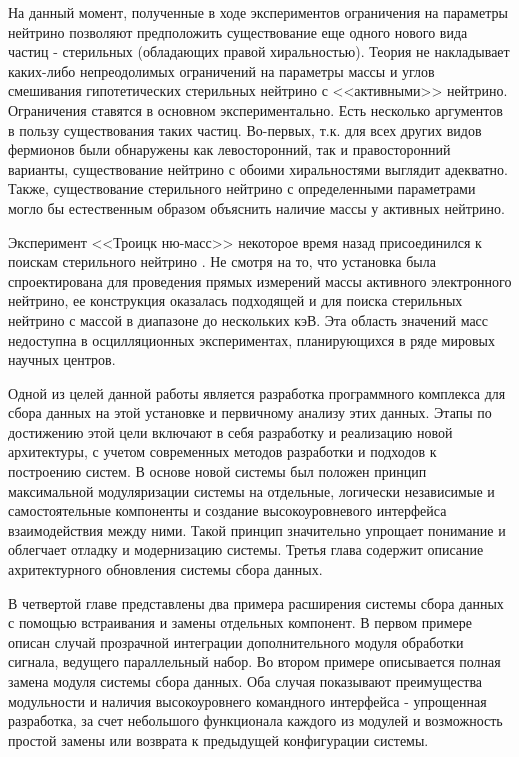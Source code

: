\documentclass[a4paper,14pt]{extreport}
\begin{document}
На данный момент, полученные в ходе экспериментов ограничения на параметры нейтрино позволяют предположить существование еще одного нового вида частиц - стерильных (обладающих правой хиральностью). Теория не накладывает каких-либо непреодолимых ограничений на параметры массы и углов смешивания гипотетических стерильных нейтрино с <<активными>> нейтрино. Ограничения ставятся в основном экспериментально. Есть несколько аргументов в пользу существования таких частиц. Во-первых, т.к. для всех других видов фермионов были обнаружены как левосторонний, так и правосторонний варианты, существование нейтрино с обоими хиральностями выглядит адекватно. Также, существование стерильного нейтрино с определенными параметрами могло бы естественным образом объяснить наличие массы у активных нейтрино.

Эксперимент <<Троицк ню-масс>> некоторое время назад присоединился к поискам стерильного нейтрино \cite{1703.10779}. Не смотря на то, что установка была спроектирована для проведения прямых измерений массы активного электронного нейтрино, ее конструкция оказалась подходящей и для поиска стерильных нейтрино с массой в диапазоне до нескольких кэВ. Эта область значений масс недоступна в осцилляционных экспериментах, планирующихся в ряде мировых научных центров. 

Одной из целей данной работы является разработка программного комплекса для сбора данных на этой установке и первичному анализу этих данных. Этапы по достижению этой цели включают в себя разработку и реализацию новой архитектуры, с учетом современных методов разработки и подходов к построению систем. В основе новой системы был положен принцип максимальной модуляризации системы на отдельные, логически независимые и самостоятельные компоненты и создание высокоуровневого интерфейса взаимодействия между ними. Такой принцип значительно упрощает понимание и облегчает отладку и модернизацию системы. Третья глава содержит описание ахритектурного обновления системы сбора данных.

В четвертой главе представлены два примера расширения системы сбора данных с помощью встраивания и замены отдельных компонент. В первом примере описан случай прозрачной интеграции дополнительного модуля обработки сигнала, ведущего параллельный набор. Во втором примере описывается полная замена модуля системы сбора данных. Оба случая показывают преимущества модульности и наличия высокоуровнего командного интерфейса - упрощенная разработка, за счет небольшого функционала каждого из модулей и возможность простой замены или возврата к предыдущей конфигурации системы.
\end{document}
